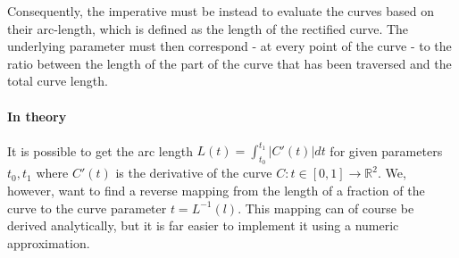 \def\earpathf{(-1,1.5) .. controls (-1,2.3) and (1,2.8) .. (1,1.5) .. controls (1, -.2) and (0.3,-.1) .. (0.3,-1) .. controls (0.2,-1.5) and (-.5, -1.7) .. (-1,-1.25);}
\def\earpaths{(3,1.5) .. controls (3,2.3) and (5,2.8) .. (5,1.5) .. controls (5, -.2) and (4.3,-.1) .. (4.3,-1) .. controls (4.2,-1.5) and (3.5, -1.7) .. (3,-1.25);}
\begin{figure}[h!]
    \centering
\end{figure}

Consequently, the imperative must be instead to evaluate the curves based on their arc-length, which is defined as the length of the rectified curve. The underlying parameter must then correspond - at every point of the curve - to the ratio between the length of the part of the curve that has been traversed and the total curve length.

\paragraph{In theory}
It is possible to get the arc length $L(t)=\int_{t_{0}}^{t_{1}} \left|C'(t)\right| dt$ for given parameters $t_{0}, t_{1}$ where $C'(t)$ is the derivative of the curve $C:t \in [0,1] \rightarrow \mathbb{R}^2$. We, however, want to find a reverse mapping from the length of a fraction of the curve to the curve parameter $t = L^{-1}(l)$. 
This mapping can of course be derived analytically, but it is far easier to implement it using a numeric approximation. 

